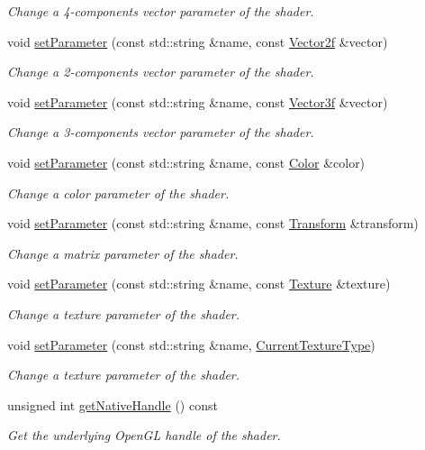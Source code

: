 \begin{DoxyCompactItemize}
\begin{DoxyCompactList}\small\item\em Change a 4-\/components vector parameter of the shader. \end{DoxyCompactList}\item 
void \hyperlink{classsf_1_1Shader_a3ac473ece2c6fa26dc5032c07fd7288e}{set\+Parameter} (const std\+::string \&name, const \hyperlink{classsf_1_1Vector2}{Vector2f} \&vector)
\begin{DoxyCompactList}\small\item\em Change a 2-\/components vector parameter of the shader. \end{DoxyCompactList}\item 
void \hyperlink{classsf_1_1Shader_a87d4a0c6dc70ae68aecc0dda3f343c07}{set\+Parameter} (const std\+::string \&name, const \hyperlink{classsf_1_1Vector3}{Vector3f} \&vector)
\begin{DoxyCompactList}\small\item\em Change a 3-\/components vector parameter of the shader. \end{DoxyCompactList}\item 
void \hyperlink{classsf_1_1Shader_aa8618119ed4399df3fd33e78ee96b4fc}{set\+Parameter} (const std\+::string \&name, const \hyperlink{classsf_1_1Color}{Color} \&color)
\begin{DoxyCompactList}\small\item\em Change a color parameter of the shader. \end{DoxyCompactList}\item 
void \hyperlink{classsf_1_1Shader_a8599ee1348407025039b89ddf3f7cb62}{set\+Parameter} (const std\+::string \&name, const \hyperlink{classsf_1_1Transform}{Transform} \&transform)
\begin{DoxyCompactList}\small\item\em Change a matrix parameter of the shader. \end{DoxyCompactList}\item 
void \hyperlink{classsf_1_1Shader_a7f58ab5c0a1084f238dfcec86602daa1}{set\+Parameter} (const std\+::string \&name, const \hyperlink{classsf_1_1Texture}{Texture} \&texture)
\begin{DoxyCompactList}\small\item\em Change a texture parameter of the shader. \end{DoxyCompactList}\item 
void \hyperlink{classsf_1_1Shader_af06b4cba0bab915fa01032b063909044}{set\+Parameter} (const std\+::string \&name, \hyperlink{structsf_1_1Shader_1_1CurrentTextureType}{Current\+Texture\+Type})
\begin{DoxyCompactList}\small\item\em Change a texture parameter of the shader. \end{DoxyCompactList}\item 
unsigned int \hyperlink{classsf_1_1Shader_ac14d0bf7afe7b6bb415d309f9c707188}{get\+Native\+Handle} () const
\begin{DoxyCompactList}\small\item\em Get the underlying Open\+GL handle of the shader. \end{DoxyCompactList}\end{DoxyCompactItemize}
